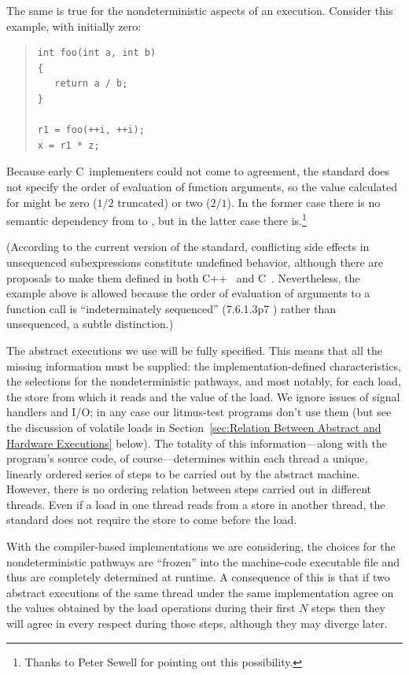 \documentclass[10]{article}
\begin{document}
The same is true for the nondeterministic aspects of an execution.
Consider this example, with  initially zero:
\begin{quote}
\begin{verbatim}
int foo(int a, int b)
{
   return a / b;
}

r1 = foo(++i, ++i);
x = r1 * z;
\end{verbatim}
\end{quote}
Because early C~implementers could not come to agreement, the standard
does not specify the order of evaluation of function arguments, so
the value calculated for  might be zero ($1/2$ truncated) or two
($2/1$).
In the former case there is no semantic dependency from  to ,
but in the latter case there is.\footnote{
	Thanks to Peter Sewell for pointing out this possibility.}

(According to the current version of the standard, conflicting side effects
in unsequenced subexpressions constitute undefined behavior,
although there are proposals to make them defined in both
C++~\cite{GabrielDosReis2016P0145r3}
and C~\cite{AlexCeleste2023N3203}.
Nevertheless, the example above is allowed because the order of evaluation
of arguments to a function call is ``indeterminately sequenced''
(7.6.1.3p7 ) rather than unsequenced, a subtle distinction.)

\medskip

The abstract executions we use will be fully specified.
This means that all the missing information must be supplied:
the implementation-defined characteristics, the selections for the
nondeterministic pathways, and most notably, for each load, the store
from which it reads and the value of the load.
We ignore issues of signal handlers and I/O;
in any case our litmus-test programs don't use them
(but see the discussion of volatile loads in
Section~\ref{sec:Relation Between Abstract and Hardware Executions} below).
The totality of this information---along with the program's source
code, of course---determines within each thread a unique, linearly
ordered series of steps to be carried out by the abstract machine.
However, there is no ordering relation between steps carried out
in different threads.  Even if a load in one thread reads from a
store in another thread, the standard does not require the store to come
before the load.

With the compiler-based implementations we are considering,
the choices for the nondeterministic pathways are ``frozen'' into the
machine-code executable file and thus are completely determined
at runtime.
A consequence of this is that if two abstract executions of the same
thread under the same implementation agree on the values obtained by
the load operations during their first $N$ steps then they will agree
in every respect during those steps, although they may diverge later.
\end{document}
